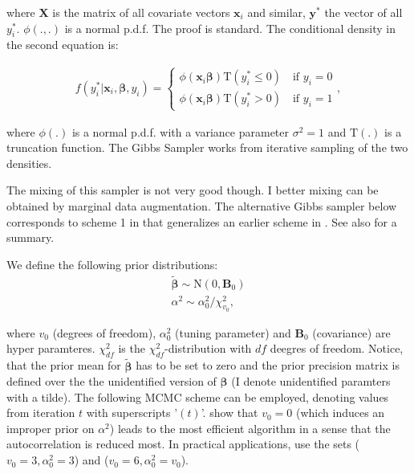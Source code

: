 \documentclass[11pt,a4paper]{article}
\newcommand{\f}{\mathit{f}}
\begin{document}
where $\mathbf{X}$ is the matrix of all covariate vectors $\mathbf{x}_i$ and similar, $\mathbf{y}^{*}$ the vector of all $y_i^{*}$. $\phi(.,.)$ is a normal p.d.f. The proof is standard. The conditional density in the second equation is: 

\begin{equation}
\begin{split}
	  \f(y_{i}^{*} | \mathbf{x}_i, \boldsymbol{\beta}, y_i)  = \left \{
	  \begin{array}{ll}
	    	\phi(\mathbf{x}_i \boldsymbol{\beta})\mathrm{T}(y_i^* \leq 0) \quad \text{if \ } y_i = 0 \\
	    	\phi(\mathbf{x}_i \boldsymbol{\beta})\mathrm{T}(y_i^* > 0) \quad \text{if \ } y_i = 1
	  \end{array} \right.,
\end{split}	
\end{equation}

where $\phi(.)$ is a normal p.d.f. with a variance parameter $\sigma^2=1$ and $\mathrm{T}(.)$ is a truncation function. The Gibbs Sampler works from iterative sampling of the two densities. 

The mixing of this sampler is not very good though. I better mixing can be obtained by marginal data augmentation.
The alternative Gibbs sampler below corresponds to scheme 1 in \citet[p. 317-318]{Imai.vanDyk.2005} that generalizes an earlier scheme in \citet{vanDyk.Meng.2001}. See also \citet[390]{Jackman.2009} for a summary. 

We define the following prior distributions: 
\begin{equation}
	\begin{split}
	\bm{\tilde{\beta}} \sim \mathrm{N}(0,\mathbf{B}_0) \\
	\alpha^2 \sim \alpha_0^2/\chi_{v_0}^2, 
	\end{split}
\end{equation}

where $v_0$ (degrees of freedom), $\alpha_0^2$ (tuning parameter) and $\mathbf{B}_0$ (covariance) are hyper paramteres. $\chi_{df}^2$ is the $\chi_{df}^2$-distribution with $df$ deegres of freedom. Notice, that the prior mean for $\bm{\tilde{\beta}}$ has to be set to zero and the prior precision matrix is defined over the the unidentified version of $\bm{\beta}$ (I denote unidentified paramters with a tilde).  The following MCMC scheme can be employed, denoting values from iteration $t$ with superscripts '$(t)$'. \citet{vanDyk.Meng.2001} show that $v_0=0$ (which induces an improper prior on $\alpha^2$) leads to the most efficient algorithm in a sense that the autocorrelation is reduced most. In practical applications, \citet{Imai.vanDyk.2005} use the sets ($v_0=3,\alpha_0^2=3$) and ($v_0=6,\alpha_0^2=v_0$). 
\end{document}
